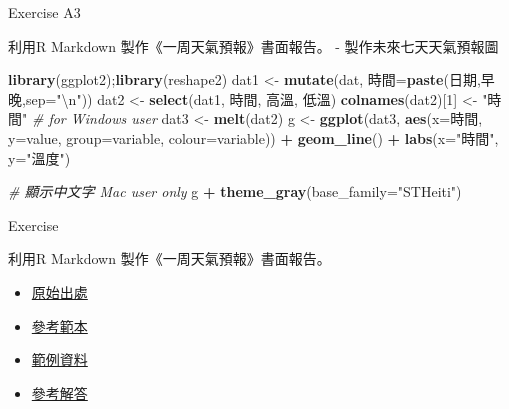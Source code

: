 \documentclass[ignorenonframetext,]{beamer}
\newenvironment{Shaded}{\begin{snugshade}}{\end{snugshade}}
\newcommand{\KeywordTok}[1]{\textcolor[rgb]{0.13,0.29,0.53}{\textbf{#1}}}
\newcommand{\DataTypeTok}[1]{\textcolor[rgb]{0.13,0.29,0.53}{#1}}
\newcommand{\DecValTok}[1]{\textcolor[rgb]{0.00,0.00,0.81}{#1}}
\newcommand{\CharTok}[1]{\textcolor[rgb]{0.31,0.60,0.02}{#1}}
\newcommand{\StringTok}[1]{\textcolor[rgb]{0.31,0.60,0.02}{#1}}
\newcommand{\CommentTok}[1]{\textcolor[rgb]{0.56,0.35,0.01}{\textit{#1}}}
\newcommand{\OperatorTok}[1]{\textcolor[rgb]{0.81,0.36,0.00}{\textbf{#1}}}
\newcommand{\NormalTok}[1]{#1}
\providecommand{\tightlist}{%
  \setlength{\itemsep}{0pt}\setlength{\parskip}{0pt}}
\begin{document}
\begin{frame}[fragile]{Exercise A3}

利用R Markdown 製作《一周天氣預報》書面報告。 - 製作未來七天天氣預報圖

\begin{Shaded}
\begin{Highlighting}[]
\KeywordTok{library}\NormalTok{(ggplot2);}\KeywordTok{library}\NormalTok{(reshape2)}
\NormalTok{dat1 <-}\StringTok{ }\KeywordTok{mutate}\NormalTok{(dat, 時間=}\KeywordTok{paste}\NormalTok{(日期,早晚,}\DataTypeTok{sep=}\StringTok{"}\CharTok{\textbackslash{}n}\StringTok{"}\NormalTok{))}
\NormalTok{dat2 <-}\StringTok{ }\KeywordTok{select}\NormalTok{(dat1, 時間, 高溫, 低溫)}
\KeywordTok{colnames}\NormalTok{(dat2)[}\DecValTok{1}\NormalTok{] <-}\StringTok{ "時間"} \CommentTok{# for Windows user}
\NormalTok{dat3 <-}\StringTok{ }\KeywordTok{melt}\NormalTok{(dat2)}
\NormalTok{g <-}\StringTok{ }\KeywordTok{ggplot}\NormalTok{(dat3, }\KeywordTok{aes}\NormalTok{(}\DataTypeTok{x=}\NormalTok{時間, }\DataTypeTok{y=}\NormalTok{value, }\DataTypeTok{group=}\NormalTok{variable, }\DataTypeTok{colour=}\NormalTok{variable)) }\OperatorTok{+}\StringTok{ }
\StringTok{  }\KeywordTok{geom_line}\NormalTok{() }\OperatorTok{+}\StringTok{ }
\StringTok{  }\KeywordTok{labs}\NormalTok{(}\DataTypeTok{x=}\StringTok{"時間"}\NormalTok{, }\DataTypeTok{y=}\StringTok{"溫度"}\NormalTok{) }
\end{Highlighting}
\end{Shaded}

\begin{Shaded}
\begin{Highlighting}[]
\CommentTok{# 顯示中文字 Mac user only}
\NormalTok{g }\OperatorTok{+}\StringTok{ }\KeywordTok{theme_gray}\NormalTok{(}\DataTypeTok{base_family=}\StringTok{"STHeiti"}\NormalTok{) }
\end{Highlighting}
\end{Shaded}

\end{frame}

\begin{frame}{Exercise}

利用R Markdown 製作《一周天氣預報》書面報告。

\begin{itemize}
\tightlist
\item
  \href{http://www.cwb.gov.tw/V7/forecast/taiwan/Taipei_City.htm}{原始出處}
\item
  \href{https://github.com/dspim/a1-basic-data-analysis-course/blob/master/RmdExQue.Rmd}{參考範本}
\item
  \href{https://github.com/dspim/a1-basic-data-analysis-course/blob/master/data/weather-utf8.csv}{範例資料}
\item
  \href{https://github.com/dspim/a1-basic-data-analysis-course/blob/master/RmdExAns.Rmd}{參考解答}
\end{itemize}

\end{frame}
\end{document}

